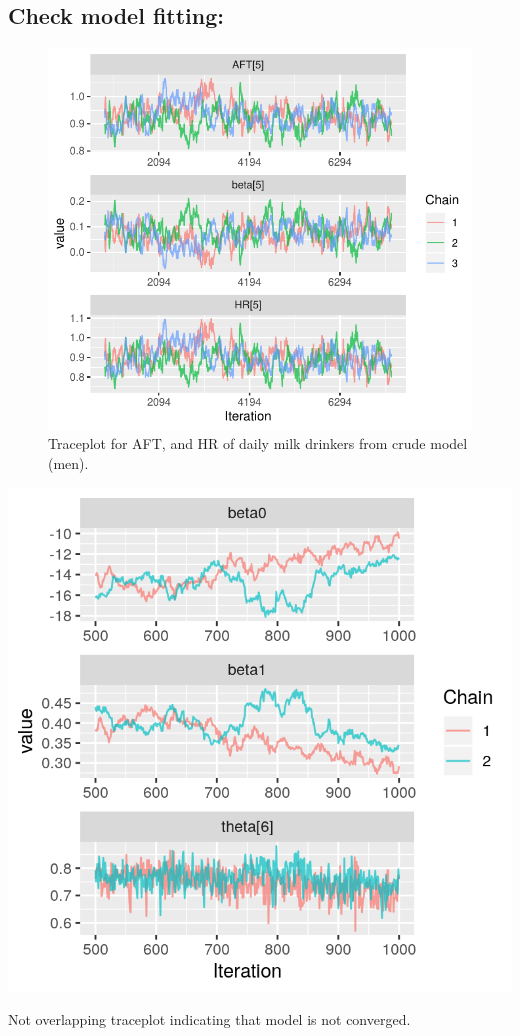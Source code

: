 \documentclass[]{tufte-handout}
\begin{document}
\hypertarget{check-model-fitting}{%
\subsection{Check model fitting:}\label{check-model-fitting}}

\begin{figure}
\includegraphics{HandOutEngBayes_files/figure-latex/unnamed-chunk-6-1} \caption[Traceplot for AFT, and HR of daily milk drinkers from crude model (men)]{Traceplot for AFT, and HR of daily milk drinkers from crude model (men).}\label{fig:unnamed-chunk-6}
\end{figure}
\begin{marginfigure}

{\centering \includegraphics[width=0.9\linewidth]{fig/badtraceplot} 

}

\caption[Not overlapping traceplot indicating that model is not converged]{Not overlapping traceplot indicating that model is not converged.}\label{fig:badtrace}
\end{marginfigure}
\end{document}
